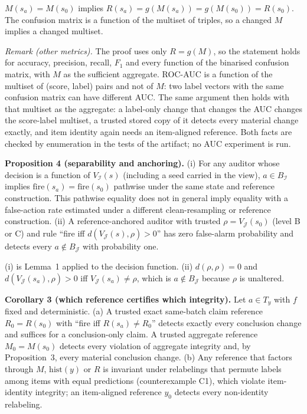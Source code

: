 \documentclass[10pt,journal,compsoc]{IEEEtran}
\begin{document}
\begin{IEEEproof}
$M(s_a)=M(s_0)$ implies $R(s_a)=g(M(s_a))=g(M(s_0))=R(s_0)$. The confusion
matrix is a function of the multiset of triples, so a changed $M$ implies a
changed multiset.
\end{IEEEproof}

\emph{Remark (other metrics).} The proof uses only $R=g(M)$, so the statement
holds for accuracy, precision, recall, $F_1$ and every function of the
binarised confusion matrix, with $M$ as the sufficient aggregate. ROC-AUC is
a function of the multiset of (score, label) pairs and not of $M$: two label
vectors with the same confusion matrix can have different AUC. The same
argument then holds with that multiset as the aggregate: a label-only change
that changes the AUC changes the score-label multiset, a trusted stored copy
of it detects every material change exactly, and item identity again needs an
item-aligned reference. Both facts are checked by enumeration in the tests
of the artifact; no AUC experiment is run.

\textbf{Proposition 4 (separability and anchoring).} (i) For any auditor
whose decision is a function of $V_{\mathcal I}(s)$ (including a seed carried
in the view), $a\in B_{\mathcal I}$ implies
$\mathrm{fire}(s_a)=\mathrm{fire}(s_0)$ pathwise under the same state and
reference construction. This pathwise equality does not in general imply
equality with a false-action rate estimated under a different clean-resampling
or reference construction.
(ii) A reference-anchored auditor with trusted $\rho=V_{\mathcal J}(s_0)$
(level B or C) and rule ``fire iff $d(V_{\mathcal J}(s),\rho)>0$'' has zero
false-alarm probability and detects every $a\notin B_{\mathcal J}$ with
probability one.

\begin{IEEEproof}
(i) is Lemma~1 applied to the decision function. (ii) $d(\rho,\rho)=0$ and
$d(V_{\mathcal J}(s_a),\rho)>0$ iff $V_{\mathcal J}(s_a)\ne\rho$, which is
$a\notin B_{\mathcal J}$ because $\rho$ is unaltered.
\end{IEEEproof}

\textbf{Corollary 3 (which reference certifies which integrity).} Let
$a\in T_y$ with $f$ fixed and deterministic. (a) A trusted exact same-batch
claim reference $R_0=R(s_0)$ with ``fire iff $R(s_a)\ne R_0$'' detects exactly
every conclusion change and suffices for a conclusion-only claim. A trusted
aggregate reference $M_0=M(s_0)$ detects every violation of aggregate integrity
and, by Proposition~3, every material conclusion change. (b) Any
reference that factors through $M$, $\mathrm{hist}(y)$ or $R$ is invariant
under relabelings that permute labels among items with equal predictions
(counterexample C1), which violate item-identity integrity; an item-aligned
reference $y_0$ detects every non-identity relabeling.
\end{document}
